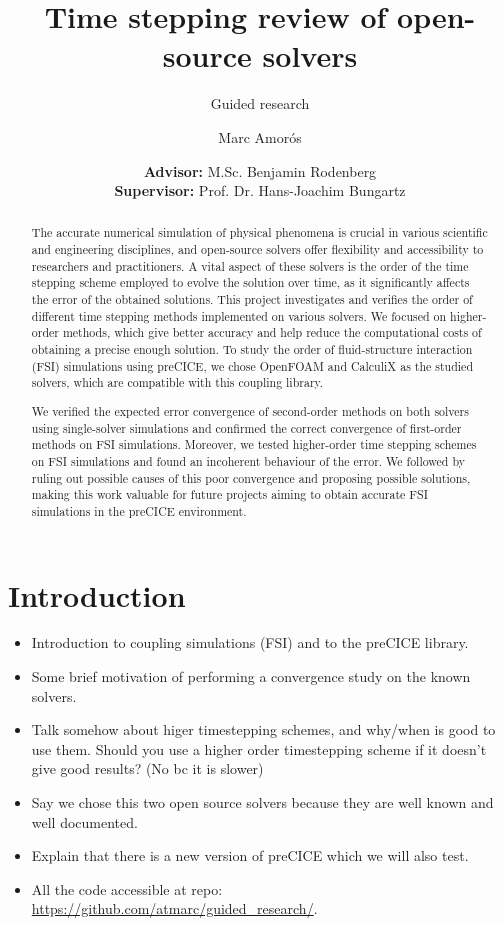 \documentclass[
  english,        %
  font=times,     %
  onecolumn,      %
]{tumarticle}
\title{Time stepping review of open-source solvers}
\subtitle{Guided research}
\author[email=marc.amoros@tum.de]{Marc Amorós}
\date{
    \small
    \textbf{Advisor:} M.Sc. Benjamin Rodenberg \\
    \textbf{Supervisor:} Prof. Dr. Hans-Joachim Bungartz \\
}
\begin{document}
\maketitle

\begin{abstract}
    The accurate numerical simulation of physical phenomena is crucial in various scientific and engineering disciplines, and open-source solvers offer flexibility and accessibility to researchers and practitioners. A vital aspect of these solvers is the order of the time stepping scheme employed to evolve the solution over time, as it significantly affects the error of the obtained solutions. This project investigates and verifies the order of different time stepping methods implemented on various solvers. We focused on higher-order methods, which give better accuracy and help reduce the computational costs of obtaining a precise enough solution. To study the order of fluid-structure interaction (FSI) simulations using preCICE, we chose OpenFOAM and CalculiX as the studied solvers, which are compatible with this coupling library. 

    We verified the expected error convergence of second-order methods on both solvers using single-solver simulations and confirmed the correct convergence of first-order methods on FSI simulations. Moreover, we tested higher-order time stepping schemes on FSI simulations and found an incoherent behaviour of the error. We followed by ruling out possible causes of this poor convergence and proposing possible solutions, making this work valuable for future projects aiming to obtain accurate FSI simulations in the preCICE environment.
\end{abstract}

\section{Introduction}
\begin{itemize}
    \item Introduction to coupling simulations (FSI) and to the preCICE library. 
    \item Some brief motivation of performing a convergence study on the known solvers.
    \item Talk somehow about higer timestepping schemes, and why/when is good to use them. Should you use a higher order timestepping scheme if it doesn't give good results? (No bc it is slower) 
    \item Say we chose this two open source solvers because they are well known and well documented.
    \item Explain that there is a new version of preCICE which we will also test.
    \item All the code accessible at repo: \url{https://github.com/atmarc/guided_research/}.
\end{itemize}
\end{document}
